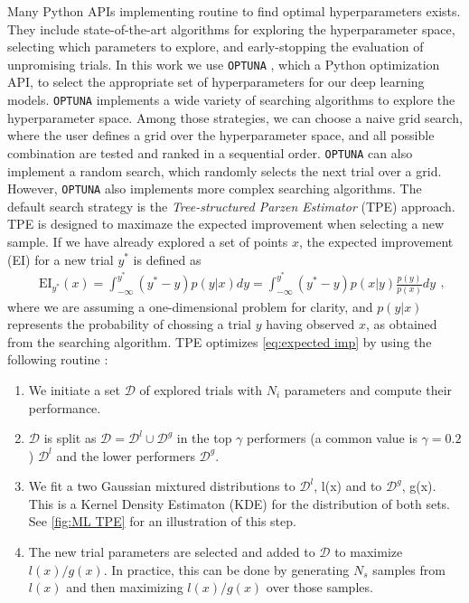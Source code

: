 Many Python APIs implementing routine to find optimal hyperparameters exists. They include state-of-the-art algorithms for exploring the hyperparameter space, selecting which parameters to explore, and early-stopping the evaluation of unpromising trials. In this work we use \texttt{OPTUNA} \cite{optuna_2019}, which a Python optimization API, to select the appropriate set of hyperparameters for our deep learning models. \texttt{OPTUNA} implements a wide variety of searching algorithms to explore the hyperparameter space. Among those strategies, we can choose a naive grid search, where the user defines a grid over the hyperparameter space, and all possible combination are tested and ranked in a sequential order. \texttt{OPTUNA} can also implement a random search, which randomly selects the next trial over a grid. However, \texttt{OPTUNA} also implements more complex searching algorithms. The default search strategy is the \emph{Tree-structured Parzen Estimator} (TPE) approach. TPE is designed to maximaze the expected improvement when selecting a new sample. If we have already explored a set of points $x$, the expected improvement (EI) for a new trial $y^*$ is defined as
\begin{equation}\label{eq:expected imp}
    \begin{aligned}&\text{EI}_{y^*}(x)=\int_{-\infty}^{y^*}(y^*-y)p(y|x)dy=\int_{-\infty}^{y^*}(y^*-y)p(x|y)\frac{p(y)}{p(x)}dy\end{aligned},
\end{equation}
where we are assuming a one-dimensional problem for clarity, and $p(y|x)$ represents the probability of chossing a trial $y$ having observed $x$, as obtained from the searching algorithm. TPE optimizes \cref{eq:expected imp} by using the following routine \cite{TPE}:
\begin{enumerate}
    \item We initiate a set $\mathcal{D}$ of explored trials with $N_i$ parameters and compute their performance.
    \item $\mathcal{D}$ is split as $\mathcal{D}=\mathcal{D}^l \cup \mathcal{D}^g$ in the top $\gamma$ performers (a common value is $\gamma=0.2$) $\mathcal{D}^l$ and the lower performers $\mathcal{D}^g$.
    \item We fit a two Gaussian mixtured distributions to $\mathcal{D}^l$, l(x) and to $\mathcal{D}^g$, g(x). This is a Kernel Density Estimaton (KDE) for the distribution of both sets. See \cref{fig:ML TPE} for an illustration of this step.
    \item The new trial parameters are selected and added to $\mathcal{D}$ to maximize $l(x)/g(x)$. In practice, this can be done by generating $N_s$ samples from $l(x)$ and then maximizing $l(x)/g(x)$ over those samples.
\end{enumerate}



